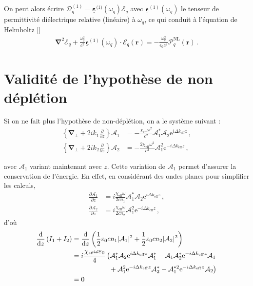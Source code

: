 \documentclass[11pt,a4paper]{article}
\newcommand{\ncite}[1]{[\citenum{#1}]}
\newcommand{\pdv}[2]{\frac{\partial #1}{\partial #2}}
\newcommand{\chie}{\chi_\mathsc{eff}}
\newcommand{\dke}{\Delta k_\mathsc{eff}}
\newcommand{\E}{\mathcal{E}}
\newcommand{\A}{\mathcal{A}}
\newcommand{\e}[1]{\text{e}^{#1}}
\newcommand{\mathsc}[1]{\mathrm{\scriptscriptstyle {#1}}}
\renewcommand{\v}[1]{\boldsymbol{\mathbf{#1}}}
\newcommand{\tens}[1]{\boldsymbol{\underline{#1}}}
\begin{document}
On peut alors écrire $\v {\boldsymbol{\mathcal D}}^\mathsc{(1)}_q = \tens \varepsilon^{\mathsc(1)}(\omega_q) \v {\boldsymbol{\mathcal E}}_q$ avec $\tens \epsilon^{(1)}(\omega_q)$ le tenseur de permittivité diélectrique relative (linéaire) à $\omega_q$, ce qui conduit à l'équation de Helmholtz \ncite{boyd}
\begin{align}
	\boldsymbol{\nabla}^2 \boldsymbol{\E}_q + \frac{\omega_q^2}{c^2}\tens\epsilon^{(1)}(\omega_q)\cdot \v \E_q(\v r) = - \frac{\omega_q^2}{\epsilon_0 c^2} \boldsymbol{\mathcal{P}}^\mathsc{NL}_q(\v r) \,.
\end{align}

\section{Validité de l'hypothèse de non déplétion}
\label{ndepl}


Si on ne fait plus l'hypothèse de non-déplétion, on a le système suivant :
\begin{equation}
\begin{aligned}
\left\{\v\nabla_\bot + 2 i k_1 \frac{\partial}{\partial z} \right\} \A_1 &= - \frac{\chie \omega^2}{c^2} \A_1^* \A_2 \e{i \dke z} \,, \\
\left\{\v\nabla_\bot + 2 i k_2 \frac{\partial}{\partial z} \right\} \A_2 &= - \frac{2 \chie \omega^2}{c^2} \A_1^2 \e{- i \dke z} \,,
\end{aligned}
\end{equation}

avec $\A_1$ variant maintenant avec $z$. Cette variation de $\A_1$ permet d'assurer la conservation de l'énergie. 
En effet, en considérant des ondes planes pour simplifier les calculs,
\begin{equation}
\begin{aligned}
\pdv{\A_1}{z} &= i \frac{\chie \omega}{2cn_1} \A_1^* \A_2 \e{i \dke z} \,, \\
\pdv{\A_2}{z} &= i \frac{\chie \omega}{2cn_2} \A_1^2 \e{- i \dke z} \,,
\label{eq:depl}
\end{aligned}
\end{equation}
d'où
\begin{equation}
\begin{aligned}
\dv{}{z} \left(I_1 + I_2 \right) &= \dv{}{z} \left(\frac12 \varepsilon_0 c n_1 |\A_1|^2 + \frac12 \varepsilon_0 c n_2 |\A_2|^2 \right) \\
&= i \frac{\chie \omega \varepsilon_0}{4} \left( \A_1^* \A_2 \e{i \dke z} \A_1^* - \A_1 \A_2^* \e{-i \dke z} \A_1 \right. \\ 
&\quad\quad\quad\quad\quad\, \left. {}+ \A_1^2 \e{- i \dke z} \A_2^* - \A_1^{*2} \e{- i \dke z} \A_2 \right) \\
&= 0
\end{aligned}
\end{equation}
\end{document}
